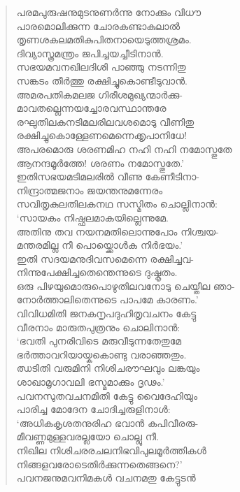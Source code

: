 \begin{verse}
പരമപുരുഷനുമുടനുണര്‍ന്നു നോക്കും വിധൗ\\
പാരമൊലിക്കുന്ന ചോരകണ്ടാകുലാല്‍\\
തൃണശകലമതികുപിതനായെടുത്തശ്രമം.\\
ദിവ്യാസ്ത്രമന്ത്രം ജപിച്ചയച്ചീടിനാന്‍.\\
സഭയമവനഖിലദിശി പാഞ്ഞു നടന്നിതു\\
സങ്കടം തീര്‍ത്തു രക്ഷിച്ചുകൊണ്ടീടുവാന്‍.\\
അമരപതികമലജ ഗിരീശമുഖ്യന്മാര്‍ക്കു-\\
മാവതല്ലെന്നയച്ചോരവസ്ഥാന്തരേ\\
രഘുതിലകനടിമലരിലവശമൊടു വീണിതു\\
രക്ഷിച്ചുകൊള്ളേണമെന്നെക്കൃപാനിധേ!\\
അപരമൊരു ശരണമിഹ നഹി നഹി നമോസ്തുതേ\\
ആനന്ദമൂര്‍ത്തേ! ശരണം നമോസ്തുതേ.’\\
ഇതിസഭയമടിമലരില്‍ വീണു കേണീടിനാ-\\
നിന്ദ്രാത്മജനാം ജയന്തനുമന്നേരം\\
സവിതൃകുലതിലകനഥ സസ്മിതം ചൊല്ലിനാന്‍:\\
‘സായകം നിഷ്ഫലമാകയില്ലെന്നുമേ.\\
അതിനു തവ നയനമതിലൊന്നുപോം നിശ്ചയ-\\
മന്തരമില്ല നീ പൊയ്ക്കൊള്‍ക നിര്‍ഭയം.’\\
ഇതി സദയമനുദിവസമെന്നെ രക്ഷിച്ചവ-\\
നിന്നുപേക്ഷിച്ചതെന്തെന്നുടെ ദുഷ്കൃതം.\\
ഒരു പിഴയുമൊരുപൊഴുതിലവനോടു ചെയ്തീല ഞാ-\\
നോര്‍ത്താലിതെന്നുടെ പാപമേ കാരണം.’\\
വിവിധമിതി ജനകനൃപദുഹിതൃവചനം കേട്ടു\\
വീരനാം മാരുതപുത്രനും ചൊലിനാന്‍:\\
‘ഭവതി പുനരിവിടെ മരുവീടുന്നതേതുമേ\\
ഭര്‍ത്താവറിയായ്കകൊണ്ടു വരാഞ്ഞതും.\\
ഝടിതി വരുമിനി നിശിചരൗഘവും ലങ്കയും\\
ശാഖാമൃഗാവലി ഭസ്മമാക്കും ദൃഢം.’\\
പവനസുതവചനമിതി കേട്ടു വൈദേഹിയും\\
പാരിച്ച മോദേന ചോദിച്ചരുളിനാള്‍:\\
‘അധികകൃശതനുരിഹ ഭവാന്‍ കപിവീരരു-\\
മീവണ്ണമുള്ളവരല്ലയോ ചൊല്ലു നീ.\\
നിഖില നിശിചരരചലനിഭവിപുലമൂര്‍ത്തികള്‍\\
നിങ്ങളവരോടെതിര്‍ക്കുന്നതെങ്ങനെ?’\\
പവനജനുമവനിമകള്‍ വചനമതു കേട്ടുടന്‍\\

\end{verse}
